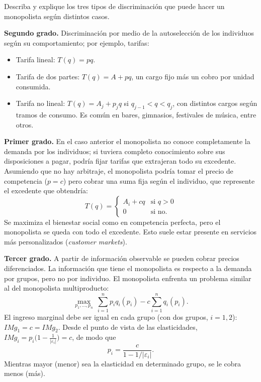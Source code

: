 \question Describa y explique los tres tipos de discriminación que puede hacer un monopolista según distintos casos.
\begin{solution}
\textbf{Segundo grado.} Discriminación por medio de la autoselección de los individuos según su comportamiento; por ejemplo, tarifas:
\begin{itemize}
  \item Tarifa lineal: $T(q) = pq$.
  \item Tarifa de dos partes: $T(q) = A + pq$, un cargo fijo más un cobro por unidad consumida.
  \item Tarifa no lineal: $T(q) = A_j + p_jq$ si $q_{j-1} < q < q_j$, con distintos cargos según tramos de consumo. Es común en bares, gimnasios, festivales de música, entre otros.
\end{itemize}
\textbf{Primer grado.} En el caso anterior el monopolista no conoce completamente la demanda por los individuos; si tuviera completo conocimiento sobre sus disposiciones a pagar, podría fijar tarifas que extrajeran todo su excedente. Asumiendo que no hay arbitraje, el monopolista podría tomar el precio de competencia ($p = c$) pero cobrar una suma fija según el individuo, que represente el excedente que obtendría:
\[
  T(q) =
  \begin{cases}
    A_i + cq & \text{si } q > 0 \\
    0 & \text{si no.}
  \end{cases}
\]
Se maximiza el bienestar social como en competencia perfecta, pero el monopolista se queda con todo el excedente. Esto suele estar presente en servicios más personalizados (\emph{customer markets}).

\textbf{Tercer grado.} A partir de información observable se pueden cobrar precios diferenciados. La información que tiene el monopolista es respecto a la demanda por grupos, pero no por individuo. El monopolista enfrenta un problema similar al del monopolista multiproducto:
\[
  \max_{p_1,\dots,p_n}\ \sum_{i=1}^{n}p_i q_i(p_i) - c\sum_{i=1}^{n}q_i(p_i).
\]
El ingreso marginal debe ser igual en cada grupo (con dos grupos, $i = 1,2$): $IMg_1 = c = IMg_2$. Desde el punto de vista de las elasticidades, $IMg_i = p_i\bigl(1 - \frac{1}{|\varepsilon_i|}\bigr) = c$, de modo que
\[
  p_i = \frac{c}{1 - 1/|\varepsilon_i|}.
\]
Mientras mayor (menor) sea la elasticidad en determinado grupo, se le cobra menos (más).

\end{solution}

